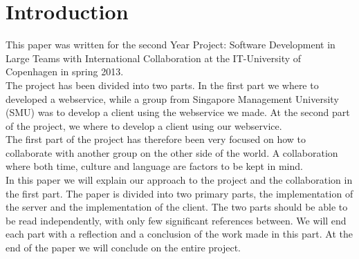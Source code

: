 \section{Introduction}
This paper was written for the second Year Project: Software Development in Large Teams with International Collaboration at the IT-University of Copenhagen in spring 2013.\\

The project has been divided into two parts. In the first part we where to developed a webservice, while a group from Singapore Management University (SMU) was to develop a client using the webservice we made. At the second part of the project, we where to develop a client using our webservice.\\

The first part of the project has therefore been very focused on how to collaborate with another group on the other side of the world. A collaboration where both time, culture and language are factors to be kept in mind.\\

In this paper we will explain our approach to the project and the collaboration in the first part.
The paper is divided into two primary parts, the implementation of the server and the implementation of the client.
The two parts should be able to be read independently, with only few significant references between. We will end each part with a reflection and a conclusion of the work made in this part.
At the end of the paper we will conclude on the entire project.
\newpage
